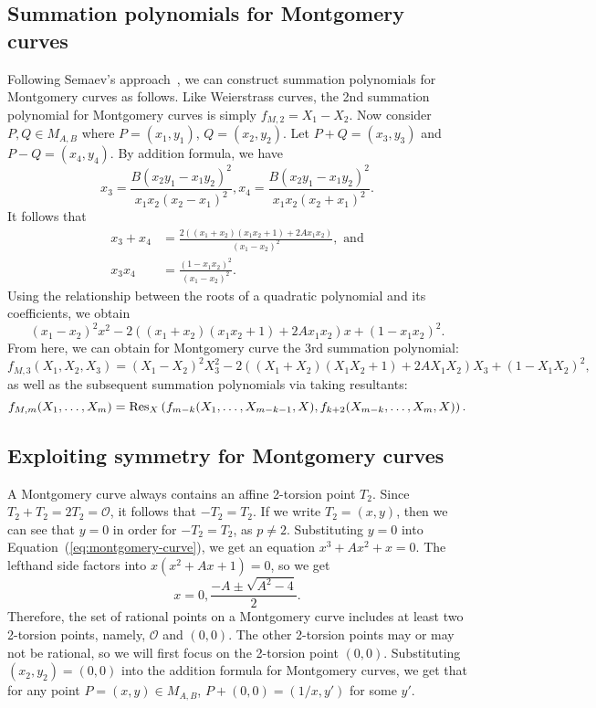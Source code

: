 \subsection{Summation polynomials for Montgomery curves}

Following Semaev's approach~\cite{DBLP:journals/iacr/Semaev04}, we can
construct summation polynomials for Montgomery curves as follows.
%
Like Weierstrass curves, the 2nd summation polynomial for Montgomery
curves is simply $f_{M,2} = X_1 - X_2$.
%
Now consider $P,Q\in M_{A, B}$ where $P=(x_1, y_1)$, $Q=(x_2, y_2)$.
%
Let $P+Q=(x_3, y_3)$ and $P-Q=(x_4, y_4)$.
%
By addition formula, we have
\[ x_3 = \frac{B(x_2y_1 - x_1y_2)^2} {x_1x_2(x_2 - x_1)^2},
  x_4 =\frac{B(x_2y_1 - x_1y_2)^2} {x_1x_2(x_2 + x_1)^2}. \]
%
It follows that
%
\begin{align*}
  x_3 + x_4&=\frac{2\left((x_1 + x_2)(x_1x_2 + 1) + 2Ax_1x_2\right)}{(x_1 - x_2)^2},\text{ and} \\
  x_3x_4&=\frac{(1 - x_1x_2)^2}{(x_1 - x_2)^2}.
\end{align*}
%
Using the relationship between the roots of a quadratic polynomial and
its coefficients, we obtain
\[ (x_1 - x_2)^2x^2 - 2\left((x_1 + x_2)(x_1x_2 + 1) +
    2Ax_1x_2\right)x + (1 - x_1x_2)^2. \]
%
From here, we can obtain for Montgomery curve the 3rd summation
polynomial:
\[ f_{M,3}(X_1,X_2,X_3) = (X_1 - X_2)^2X_3^2 - 2\left((X_1 +
    X_2)(X_1X_2 + 1) + 2AX_1X_2\right)X_3 + (1-X_1X_2)^2, \]
%
as well as the subsequent summation polynomials via taking resultants:
\[ f_{M,m}(X_1,\ldots,X_m) =
  \operatorname{Res}_X\left(f_{m-k}(X_1,\ldots,X_{m-k-1},X),f_{k+2}(X_{m-k},\ldots,X_m,X)\right). \]
\subsection{Exploiting symmetry for Montgomery curves} \label{subsec:TSPL}
A Montgomery curve always contains an affine 2-torsion point $T_2$.
%
Since $T_2+T_2=2T_2=\mathcal O$, it follows that $-T_2=T_2$.
%
If we write $T_2=(x,y)$, then we can see that $y=0$ in order for
$-T_2=T_2$, as $p\neq 2$.
%
Substituting $y=0$ into Equation~(\ref{eq:montgomery-curve}),
we get an equation $x^3+Ax^2+x=0$.
%
The lefthand side factors into $x(x^2+Ax+1)=0$, so we get \[
  x=0,\frac{-A\pm\sqrt{A^2 - 4}}{2}. \]
%
Therefore, the set of rational points on a Montgomery curve includes
at least two 2-torsion points, namely, $\mathcal O$ and $(0,0)$.
%
The other 2-torsion points may or may not be rational, so we will
first focus on the 2-torsion point $(0,0)$.
%
Substituting $(x_2,y_2)=(0,0)$ into the addition formula for
Montgomery curves, we get that for any point $P=(x,y)\in M_{A,B}$,
$P+(0,0)=(1/x,y')$ for some $y'$.

